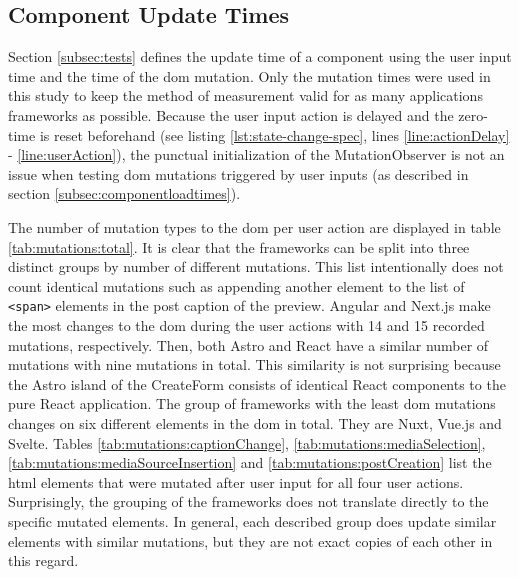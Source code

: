 \documentclass[a4paper, 12pt]{article}
\begin{document}
\subsection{Component Update Times}\label{subsec:componentupdatetimes}

Section \ref{subsec:tests} defines the update time of a component using the user input time and the time of the \acrshort{dom} mutation.
Only the mutation times were used in this study to keep the method of measurement valid for as many applications frameworks as possible.
Because the user input action is delayed and the zero-time is reset beforehand (see listing \ref{lst:state-change-spec}, lines \ref{line:actionDelay} - \ref{line:userAction}), the punctual initialization of the MutationObserver is not an issue when testing \acrshort{dom} mutations triggered by user inputs (as described in section \ref{subsec:componentloadtimes}).

The number of mutation types to the \acrshort{dom} per user action are displayed in table \ref{tab:mutations:total}.
It is clear that the frameworks can be split into three distinct groups by number of different mutations.
This list intentionally does not count identical mutations such as appending another element to the list of \verb|<span>| elements in the post caption of the preview.
Angular and Next.js make the most changes to the \acrshort{dom} during the user actions with 14 and 15 recorded mutations, respectively.
Then, both Astro and React have a similar number of mutations with nine mutations in total.
This similarity is not surprising because the Astro island of the CreateForm consists of identical React components to the pure React application.
The group of frameworks with the least \acrshort{dom} mutations changes on six different elements in the \acrshort{dom} in total.
They are Nuxt, Vue.js and Svelte.
Tables \ref{tab:mutations:captionChange}, \ref{tab:mutations:mediaSelection}, \ref{tab:mutations:mediaSourceInsertion} and \ref{tab:mutations:postCreation} list the \acrshort{html} elements that were mutated after user input for all four user actions.
Surprisingly, the grouping of the frameworks does not translate directly to the specific mutated elements.
In general, each described group does update similar elements with similar mutations, but they are not exact copies of each other in this regard.
\end{document}
